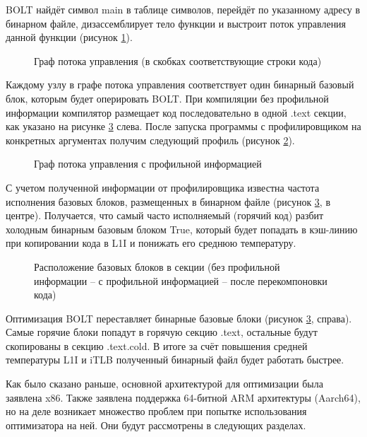 BOLT найдёт символ main в таблице символов, перейдёт по указанному адресу в бинарном файле, дизассемблирует тело функции и выстроит поток управления данной функции (рисунок \cref{fig:CFG}).

\begin{figure}[!h]
    \centerfloat{
        \texttt{[image: 6]}
    }
    \caption{Граф потока управления (в скобках соответствующие строки кода)}\label{fig:CFG}
\end{figure}

Каждому узлу в графе потока управления соответствует один бинарный базовый блок, которым будет оперировать BOLT. При компиляции без профильной информации компилятор размещает код последовательно в одной .text секции, как указано на рисунке \cref{fig:BBOpt} слева. После запуска программы с профилировщиком на конкретных аргументах получим следующий профиль (рисунок \cref{fig:CFGProfile}).

\begin{figure}[!h]
    \centerfloat{
        \texttt{[image: 7]}
    }
    \caption{Граф потока управления с профильной информацией}\label{fig:CFGProfile}
\end{figure}

С учетом полученной информации от профилировщика известна частота исполнения базовых блоков, размещенных в бинарном файле (рисунок \cref{fig:BBOpt}, в центре). Получается, что самый часто исполняемый (горячий код) разбит холодным бинарным базовым блоком True, который будет попадать в кэш-линию при копировании кода в L1I и понижать его среднюю температуру.

\begin{figure}[!h]
    \centerfloat{
        \texttt{[image: 8]}
    }
    \caption{Расположение базовых блоков в секции (без профильной информации – с профильной информацией – после перекомпоновки кода)}\label{fig:BBOpt}
\end{figure}

Оптимизация BOLT переставляет бинарные базовые блоки (рисунок \cref{fig:BBOpt}, справа). Самые горячие блоки попадут в горячую секцию .text, остальные будут скопированы в секцию .text.cold. В итоге за счёт повышения средней температуры L1I  и iTLB полученный бинарный файл будет работать быстрее.

Как было сказано раньше, основной архитектурой для оптимизации была заявлена x86. Также заявлена поддержка 64-битной ARM архитектуры (Aarch64), но на деле возникает множество проблем при попытке использования оптимизатора на ней. Они будут рассмотрены в следующих разделах.


